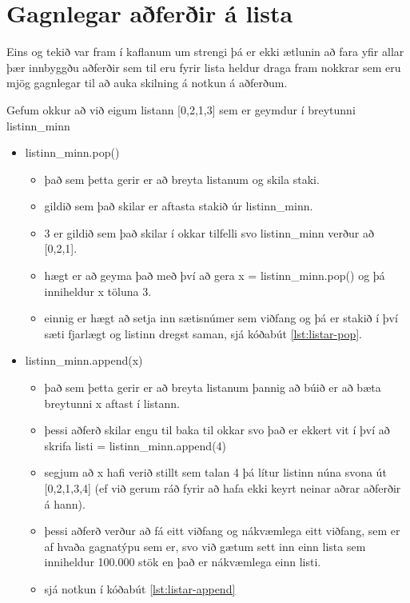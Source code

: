 \section{Gagnlegar aðferðir á lista}\label{uk:aðferðir-listar}

Eins og tekið var fram í kaflanum um strengi þá er ekki ætlunin að fara yfir allar þær innbyggðu aðferðir sem til eru fyrir lista heldur draga fram nokkrar sem eru mjög gagnlegar til að auka skilning á notkun á aðferðum.

Gefum okkur að við eigum listann [0,2,1,3] sem er geymdur í breytunni listinn\_minn

\begin{itemize}
	\item listinn\_minn.pop() 
	\begin{itemize}
		\item það sem þetta gerir er að breyta listanum og skila staki.
		\item gildið sem það skilar er aftasta stakið úr listinn\_minn.
		\item 3 er gildið sem það skilar í okkar tilfelli svo listinn\_minn verður að [0,2,1].
		\item hægt er að geyma það með því að gera x = listinn\_minn.pop() og þá inniheldur x töluna 3.
		\item einnig er hægt að setja inn sætisnúmer sem viðfang og þá er stakið í því sæti fjarlægt og listinn dregst saman, sjá kóðabút \ref{lst:listar-pop}.
	\end{itemize}
	\item listinn\_minn.append(x)
	\begin{itemize}
		\item það sem þetta gerir er að breyta listanum þannig að búið er að bæta breytunni x aftast í listann.
		\item þessi aðferð skilar engu til baka til okkar svo það er ekkert vit í því að skrifa listi = listinn\_minn.append(4)
		\item segjum að x hafi verið stillt sem talan 4 þá lítur listinn núna svona út [0,2,1,3,4] (ef við gerum ráð fyrir að hafa ekki keyrt neinar aðrar aðferðir á hann).
		\item þessi aðferð verður að fá eitt viðfang og nákvæmlega eitt viðfang, sem er af hvaða gagnatýpu sem er, svo við gætum sett inn einn lista sem inniheldur 100.000 stök en það er nákvæmlega einn listi.
		\item sjá notkun í kóðabút \ref{lst:listar-append}
	\end{itemize}

\end{itemize}
